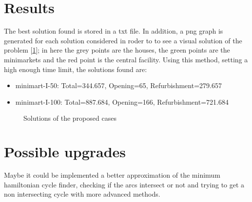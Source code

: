 \documentclass[11pt]{article} %
\begin{document}
\section{Results}
The best solution found is stored in a txt file. In addition, a png graph is generated for each solution considered in roder to to see a visual solution of the problem [\ref{fig:optimal graphs}]; in here the grey points are the houses, the green points are the minimarkets and the red point is the central facility. Using this method, setting a high enough time limit, the solutions found are:
\begin{itemize}
\item minimart-I-50: Total=344.657, Opening=65, Refurbishment=279.657
\item minimart-I-100: Total=887.684, Opening=166, Refurbishment=721.684
\end{itemize}

\begin{figure}[h]
    \centering
    \qquad
    \caption{Solutions of the proposed cases}%
    \label{fig:optimal graphs}%
\end{figure}

\section{Possible upgrades}
Maybe it could be implemented a better approximation of the minimum hamiltonian cycle finder, checking if the arcs intersect or not and trying to get a non intersecting cycle with more advanced methods.
\end{document}
